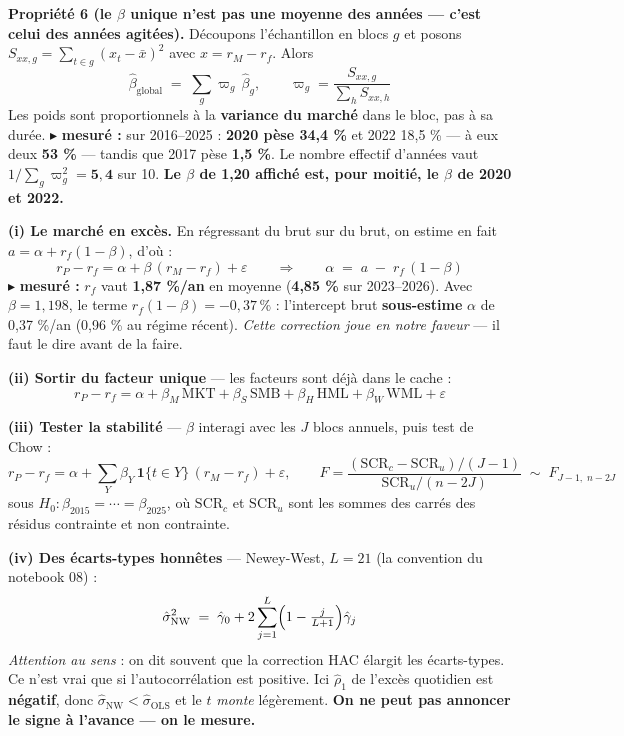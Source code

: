 \documentclass[11pt,a4paper]{article}
\newcommand{\prop}[2]{\vspace{0.6mm}\begin{mdframed}[linecolor=vert!60, backgroundcolor=vert!5, linewidth=0.6pt,
  roundcorner=3pt, innertopmargin=3pt, innerbottommargin=3pt]{\color{vert}\textbf{Propriété #1.}} #2\end{mdframed}\vspace{0.4mm}}
\newcommand{\mes}[1]{{\color{rouge}\small$\blacktriangleright$ \textbf{mesuré :} #1}\par}
\begin{document}
\prop{6 (le $\beta$ unique n'est pas une moyenne des années --- c'est celui des années agitées)}{Découpons
l'échantillon en blocs $g$ et posons $S_{xx,g} = \sum_{t \in g}(x_t - \bar x)^2$ avec $x = r_M - r_f$. Alors
\[
\hat\beta_{\text{global}} \;=\; \sum_g \varpi_g\, \hat\beta_g,
\qquad
\varpi_g = \frac{S_{xx,g}}{\sum_h S_{xx,h}}
\]
Les poids sont proportionnels à la \textbf{variance du marché} dans le bloc, pas à sa durée.
\mes{sur 2016--2025 : \textbf{2020 pèse 34,4 \%} et 2022 18,5 \% --- à eux deux \textbf{53 \%} --- tandis que 2017 pèse
\textbf{1,5 \%}. Le nombre effectif d'années vaut $1/\sum_g \varpi_g^2 = \mathbf{5{,}4}$ sur 10.
\textbf{Le $\beta$ de 1,20 affiché est, pour moitié, le $\beta$ de 2020 et 2022.}}}

\textbf{(i) Le marché en excès.} En régressant du brut sur du brut, on estime en fait
$a = \alpha + r_f(1-\beta)$, d'où :
\[
r_P - r_f = \alpha + \beta\,(r_M - r_f) + \varepsilon
\qquad\Longrightarrow\qquad
\alpha \;=\; a \;-\; r_f\,(1-\beta)
\]
\mes{$r_f$ vaut \textbf{1,87 \%/an} en moyenne (\textbf{4,85 \%} sur 2023--2026). Avec $\beta = 1{,}198$, le terme
$r_f(1-\beta) = -0{,}37\,\%$ : l'intercept brut \textbf{sous-estime} $\alpha$ de 0,37 \%/an (0,96 \% au régime récent).
\emph{Cette correction joue en notre faveur} --- il faut le dire avant de la faire.}

\textbf{(ii) Sortir du facteur unique} --- les facteurs sont déjà dans le cache :
\[
r_P - r_f = \alpha + \beta_M\,\mathrm{MKT} + \beta_S\,\mathrm{SMB} + \beta_H\,\mathrm{HML} + \beta_W\,\mathrm{WML} + \varepsilon
\]

\textbf{(iii) Tester la stabilité} --- $\beta$ interagi avec les $J$ blocs annuels, puis test de Chow :
\[
r_P - r_f = \alpha + \sum_{Y} \beta_Y\, \mathbf{1}\{t \in Y\}\,(r_M - r_f) + \varepsilon,
\qquad
F = \frac{(\mathrm{SCR}_c - \mathrm{SCR}_u)/(J-1)}{\mathrm{SCR}_u/(n-2J)} \;\sim\; F_{J-1,\; n-2J}
\]
sous $H_0 : \beta_{2015} = \cdots = \beta_{2025}$, où $\mathrm{SCR}_c$ et $\mathrm{SCR}_u$ sont les sommes des carrés
des résidus contrainte et non contrainte.

\textbf{(iv) Des écarts-types honnêtes} --- Newey-West, $L = 21$ (la convention du notebook 08) :
\[
\hat\sigma^2_{\mathrm{NW}} \;=\; \hat\gamma_0 + 2\sum_{j=1}^{L}\Bigl(1 - \tfrac{j}{L+1}\Bigr)\hat\gamma_j
\]
{\small\emph{Attention au sens} : on dit souvent que la correction HAC \og élargit \fg{} les écarts-types. Ce n'est vrai
que si l'autocorrélation est positive. Ici $\hat\rho_1$ de l'excès quotidien est \textbf{négatif}, donc
$\hat\sigma_{\mathrm{NW}} < \hat\sigma_{\mathrm{OLS}}$ et le $t$ \emph{monte} légèrement. \textbf{On ne peut pas annoncer
le signe à l'avance --- on le mesure.}}
\end{document}
